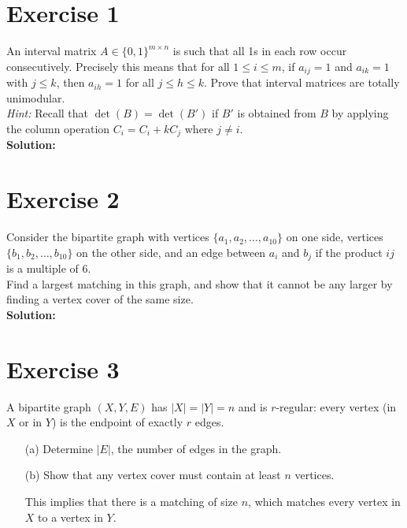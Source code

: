 \documentclass{article}
\begin{document}
\section*{Exercise 1}
An interval matrix $A \in \{0, 1\}^{m\times n}$ is such that all 1s in each row occur consecutively. Precisely this means that for all $1 \leq i \leq m$, if $a_{ij} = 1$ and $a_{ik} = 1$ with $j \leq k$, then $a_{ih} = 1$ for all $j \leq h \leq k$. Prove that interval matrices are totally unimodular. \\

\textit{Hint:} Recall that $\det(B) = \det(B')$ if $B'$ is obtained from $B$ by applying the column operation $C_i = C_i + kC_j$ where $j \neq i$. \\

\textbf{Solution:} \\



\newpage

\section*{Exercise 2}
Consider the bipartite graph with vertices $\{a_1, a_2, \ldots, a_{10}\}$ on one side, vertices $\{b_1, b_2, \ldots, b_{10}\}$ on the other side, and an edge between $a_i$ and $b_j$ if the product $ij$ is a multiple of 6. \\

Find a largest matching in this graph, and show that it cannot be any larger by finding a vertex cover of the same size. \\

\textbf{Solution:} \\



\newpage

\section*{Exercise 3}
A bipartite graph $(X,Y,E)$ has $|X| = |Y| = n$ and is $r$-regular: every vertex (in $X$ or in $Y$) is the endpoint of exactly $r$ edges.

\begin{itemize}
    \item[(a)] Determine $|E|$, the number of edges in the graph.
    \item[(b)] Show that any vertex cover must contain at least $n$ vertices.
    
    This implies that there is a matching of size $n$, which matches every vertex in $X$ to a vertex in $Y$.
\end{itemize}
\end{document}
